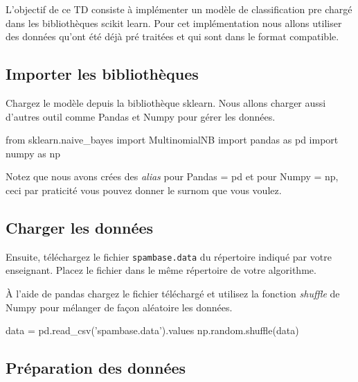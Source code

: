 L'objectif de ce TD consiste à implémenter un modèle de classification pre chargé dans les bibliothèques scikit learn. Pour cet implémentation nous allons utiliser des données qu'ont été déjà pré traitées et qui sont dans le format compatible.

\subsection{Importer les bibliothèques}

Chargez le modèle depuis la bibliothèque sklearn. Nous allons charger aussi d'autres outil comme Pandas et Numpy pour gérer les données.

\begin{python}
from sklearn.naive_bayes import MultinomialNB
import pandas as pd
import numpy as np
\end{python}
Notez que nous avons crées des \textit{alias} pour Pandas = pd et pour Numpy = np, ceci par praticité vous pouvez donner le surnom que vous voulez.
\subsection{Charger les données}

Ensuite, téléchargez le fichier \texttt{spambase.data} du répertoire indiqué par votre enseignant. Placez le fichier dans le même répertoire de votre algorithme.

À l'aide de pandas chargez le fichier téléchargé et utilisez la fonction \textit{shuffle} de Numpy pour mélanger de façon aléatoire les données.

\begin{python}
data = pd.read_csv('spambase.data').values
np.random.shuffle(data)
\end{python}


\subsection{Préparation des données}

